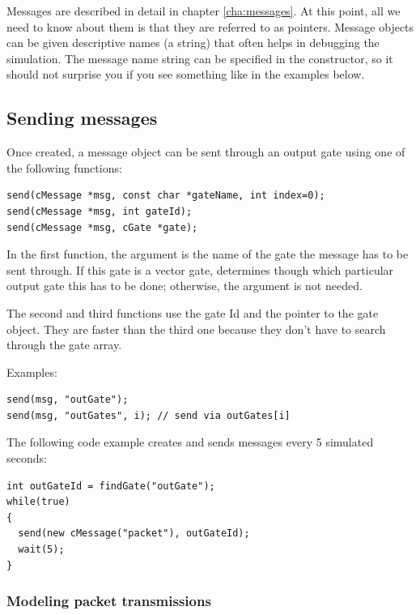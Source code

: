 Messages are described in detail in chapter \ref{cha:messages}.
At this point, all we need to know about them is that they are
referred to as  pointers. Message objects
can be given descriptive names (a  string)
that often helps in debugging the simulation. The message
name string can be specified in the constructor, so it
should not surprise you if you see something like
 in the examples below.



\subsection{Sending messages}

Once created, a message object can be sent through an
output gate using one of the following functions:

\begin{verbatim}
send(cMessage *msg, const char *gateName, int index=0);
send(cMessage *msg, int gateId);
send(cMessage *msg, cGate *gate);
\end{verbatim}

In the first function, the argument  is the name of
the gate the message has to be sent through. If this gate is
a vector gate,  determines though which particular output
gate this has to be done; otherwise, the  argument is not
needed.

The second and third functions use the gate Id and the pointer to the gate
object. They are faster than the third one because they don't have to
search through the gate array.

Examples:

\begin{verbatim}
send(msg, "outGate");
send(msg, "outGates", i); // send via outGates[i]
\end{verbatim}

The following code example creates and sends messages
every 5 simulated seconds:

\begin{verbatim}
int outGateId = findGate("outGate");
while(true)
{
  send(new cMessage("packet"), outGateId);
  wait(5);
}
\end{verbatim}


\subsubsection{Modeling packet transmissions}

